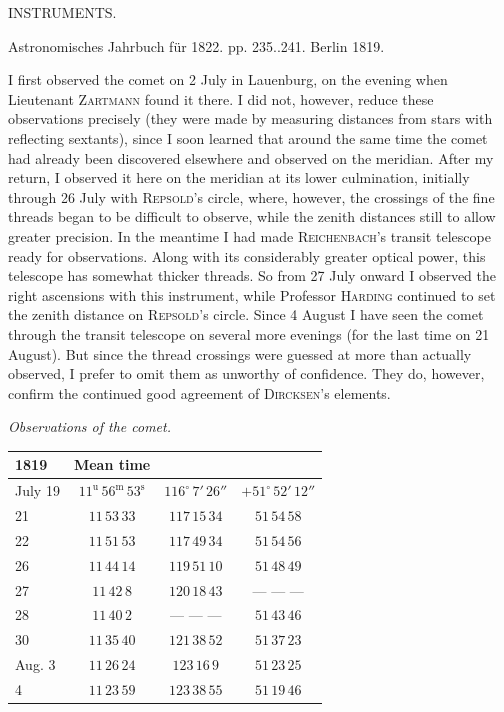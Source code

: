 \clearpage
{}
\hypertarget{native-429-part-lower}{}
\begin{center}{\Large INSTRUMENTS.}\end{center}
\begin{center}
Astronomisches Jahrbuch für 1822. pp. 235..241. Berlin 1819.
\end{center}

\par\indent I first observed the comet on 2 July in Lauenburg, on the evening when Lieutenant \textsc{Zartmann} found it there. I did not, however, reduce these observations precisely (they were made by measuring distances from stars with reflecting sextants), since I soon learned that around the same time the comet had already been discovered elsewhere and observed on the meridian. After my return, I observed it here on the meridian at its lower culmination, initially through 26 July with \textsc{Repsold}’s circle, where, however, the crossings of the fine threads began to be difficult to observe, while the zenith distances still to allow greater precision. 
In the meantime I had made \textsc{Reichenbach}’s transit telescope ready for observations. Along with its considerably greater optical power, this telescope has somewhat thicker threads. So from 27 July onward I observed the right ascensions with this instrument, while Professor \textsc{Harding} continued to set the zenith distance on \textsc{Repsold}’s circle. Since 4 August I have seen the comet through the transit telescope on several more evenings (for the last time on 21 August). But since the thread crossings were guessed at more than actually observed, I prefer to omit them as unworthy of confidence. They do, however, confirm the continued good agreement of \textsc{Dircksen}’s elements.

\begin{center}
\emph{Observations of the comet.}
\end{center}

\begin{center}
\begin{tabular}{l|c|c|c}
1819 & Mean time & & \\
\hline
July 19 & $11^{\mathrm u}\,56^{\mathrm m}\,53^{\mathrm s}$ & $116^\circ\,7'\,26''$ & $+51^\circ\,52'\,12''$ \\
21 & $11\,53\,33$ & $117\,15\,34$ & $51\,54\,58$ \\
22 & $11\,51\,53$ & $117\,49\,34$ & $51\,54\,56$ \\
26 & $11\,44\,14$ & $119\,51\,10$ & $51\,48\,49$ \\
27 & $11\,42\,8$ & $120\,18\,43$ & --- --- --- \\
28 & $11\,40\,2$ & --- --- --- & $51\,43\,46$ \\
30 & $11\,35\,40$ & $121\,38\,52$ & $51\,37\,23$ \\
Aug. 3 & $11\,26\,24$ & $123\,16\,9$ & $51\,23\,25$ \\
4 & $11\,23\,59$ & $123\,38\,55$ & $51\,19\,46$ \\
\end{tabular}
\end{center}

